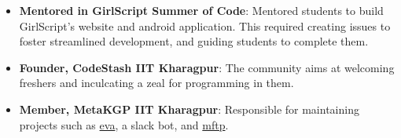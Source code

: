\documentclass[a4paper,10pt]{extarticle} %
\begin{document}
\begin{itemize}[leftmargin=0.55cm, rightmargin=0.2cm, label={\Large\textbullet}]
\item \textbf{Mentored in GirlScript Summer of Code}: Mentored students to build GirlScript's website and android application. This required creating issues to foster streamlined development, and guiding students to complete them.
\item \textbf{Founder, CodeStash IIT Kharagpur}: The community aims at welcoming freshers and inculcating a zeal for programming in them.
\item \textbf{Member, MetaKGP IIT Kharagpur}: Responsible for maintaining projects such as \href{https://www.github.com/thealphadollar/eva}{eva}, a slack bot, and \href{https://github.com/metakgp/mftp}{mftp}.
\end{itemize}




\end{document}
